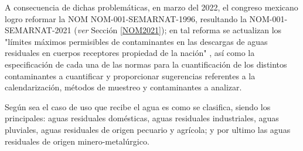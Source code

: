 A consecuencia de dichas problemáticas, en marzo del 2022, el congreso mexicano logro reformar la \gls{NOM} NOM-001-SEMARNAT-1996, resultando la NOM-001-SEMARNAT-2021 (\emph{ver} Sección \ref{NOM2021}); en tal reforma se actualizan los "límites máximos permisibles de contaminantes en las descargas de aguas residuales en cuerpos receptores propiedad de la nación" \citep{NOM2021}, así como la especificación de cada una de las normas para la cuantificación de los distintos contaminantes a cuantificar y proporcionar sugerencias referentes a la calendarización, métodos de muestreo y contaminantes a analizar.\par
Según sea el caso de uso que recibe el agua es como se clasifica, siendo los principales: aguas residuales domésticas, aguas residuales industriales, aguas pluviales, aguas residuales de origen pecuario y agrícola; y por ultimo las aguas residuales de origen minero-metalúrgico.\par
